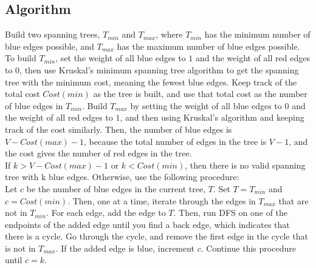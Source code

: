 \documentclass[12pt]{article}
\begin{document}
\subsection*{Algorithm}
Build two spanning trees, $T_{min}$ and $T_{max}$, where $T_{min}$ has the minimum number of blue edges possible, and $T_{max}$ has the maximum number of blue edges possible. To build $T_{min}$, set the weight of all blue edges to $1$ and the weight of all red edges to $0$, then use Kruskal's minimum spanning tree algorithm to get the spanning tree with the minimum cost, meaning the fewest blue edges. Keep track of the total cost $Cost(min)$ as the tree is built, and use that total cost as the number of blue edges in $T_{min}$. Build $T_{max}$ by setting the weight of all blue edges to $0$ and the weight of all red edges to $1$, and then using Kruskal's algorithm and keeping track of the cost similarly. Then, the number of blue edges is $V-Cost(max)-1$, because the total number of edges in the tree is $V-1$, and the cost gives the number of red edges in the tree.\\
If $k > V-Cost(max)-1$ or $k < Cost(min)$, then there is no valid spanning tree with k blue edges. Otherwise, use the following procedure:\\
Let $c$ be the number of blue edges in the current tree, $T$. Set $T = T_{min}$ and $c = Cost(min)$. Then, one at a time, iterate through the edges in $T_{max}$ that are not in $T_{min}$. For each edge, add the edge to $T$. Then, run DFS on one of the endpoints of the added edge until you find a back edge, which indicates that there is a cycle. Go through the cycle, and remove the first edge in the cycle that is not in $T_{max}$. If the added edge is blue, increment $c$. Continue this procedure until $c=k$.
\end{document}
